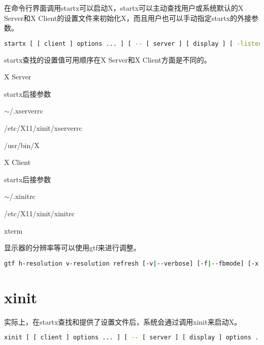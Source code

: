 在命令行界面调用startx可以启动X，startx可以主动查找用户或系统默认的X Server和X Client的设置文件来初始化X，而且用户也可以手动指定startx的外接参数。

\begin{lstlisting}[language=bash]
startx [ [ client ] options ... ] [ -- [ server ] [ display ] [ -listen ] options ... ]
\end{lstlisting}

startx查找的设置值可用顺序在X Server和X Client方面是不同的。

\begin{compactitem}
\item X Server

\begin{compactenum}
\item startx后接参数
\item $\sim$/.xserverrc
\item /etc/X11/xinit/xserverrc
\item /usr/bin/X
\end{compactenum}

\item X Client

\begin{compactitem}
\item startx后接参数
\item $\sim$/.xinitrc
\item /etc/X11/xinit/xinitrc
\item xterm
\end{compactitem}

\end{compactitem}

显示器的分辨率等可以使用gtf来进行调整。

\begin{lstlisting}[language=bash]
gtf h-resolution v-resolution refresh [-v|--verbose] [-f|--fbmode] [-x|--xorgmode]
\end{lstlisting}



\section{xinit}

实际上，在startx查找和提供了设置文件后，系统会通过调用xinit来启动X。


\begin{lstlisting}[language=bash]
xinit [ [ client ] options ... ] [ -- [ server ] [ display ] options ... ]
\end{lstlisting}


